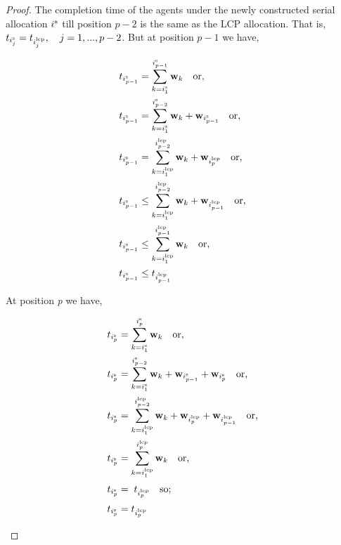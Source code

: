 \documentclass[letterpaper]{article} %
\theoremstyle{definition}
\begin{document}
\begin{proof}
\noindent The completion time of the agents under the newly constructed serial allocation $i^{\textnormal{s}}$ till position $p-2$ is the same as the LCP allocation. That is, $t_{i^{\textnormal{s}}_{j}} = t_{i^{\textnormal{lcp}}_{j}}, \quad j = 1, ..., p-2$. But at position $p-1$ we have,
\begin{linenomath}
\begin{equation*}
\begin{split}
t_{i^{\textnormal{s}}_{p-1}} & = \displaystyle \sum^{i^{\textnormal{s}}_{p-1}}_{k=i^{\textnormal{s}}_{1}} \mathbf{w}_{k} \quad  \textnormal{or,}\\
t_{i^{\textnormal{s}}_{p-1}} & = \displaystyle \sum^{i^{\textnormal{s}}_{p-2}}_{k=i^{\textnormal{s}}_{1}} \mathbf{w}_{k} + \mathbf{w}_{i^{\textnormal{s}}_{p-1}} \quad \textnormal{or,}\\
t_{i^{\textnormal{s}}_{p-1}} & = \displaystyle \sum^{i^{\textnormal{lcp}}_{p-2}}_{k=i^{\textnormal{lcp}}_{1}} \mathbf{w}_{k} + \mathbf{w}_{i^{\textnormal{lcp}}_{p}} \quad \textnormal{or,}\\
t_{i^{\textnormal{s}}_{p-1}} & \leq \displaystyle \sum^{i^{\textnormal{lcp}}_{p-2}}_{k=i^{\textnormal{lcp}}_{1}} \mathbf{w}_{k} + \mathbf{w}_{i^{\textnormal{lcp}}_{p-1}} \quad \textnormal{or,}\\
t_{i^{\textnormal{s}}_{p-1}} & \leq \displaystyle \sum^{i^{\textnormal{lcp}}_{p-1}}_{k=i^{\textnormal{lcp}}_{1}} \mathbf{w}_{k} \quad \textnormal{or,}\\
t_{i^{\textnormal{s}}_{p-1}} & \leq t_{i^{\textnormal{lcp}}_{p-1}}
\end{split}    
\end{equation*}
\end{linenomath}

\noindent At position \textit{p} we have,
\begin{linenomath}
\begin{equation*}
\begin{split}
t_{i^{\textnormal{s}}_{p}} & =\displaystyle \sum^{i^{\textnormal{s}}_{p}}_{k=i^{\textnormal{s}}_{1}} \mathbf{w}_{k} \quad \textnormal{or,}\\
t_{i^{\textnormal{s}}_{p}} & = \displaystyle \sum^{i^{\textnormal{s}}_{p-2}}_{k=i^{\textnormal{s}}_{1}} \mathbf{w}_{k} + \mathbf{w}_{i^{\textnormal{s}}_{p-1}} + \mathbf{w}_{i^{\textnormal{s}}_{p}} \quad \textnormal{or,}\\ t_{i^{\textnormal{s}}_{p}} & = \displaystyle \sum^{i^{\textnormal{lcp}}_{p-2}}_{k=i^{\textnormal{lcp}}_{1}} \mathbf{w}_{k} + \mathbf{w}_{i^{\textnormal{lcp}}_{p}} + \mathbf{w}_{i^{\textnormal{lcp}}_{p-1}} \quad \textnormal{or,}\\
t_{i^{\textnormal{s}}_{p}} & = \displaystyle \sum^{i^{\textnormal{lcp}}_{p}}_{k=i^{\textnormal{lcp}}_{1}} \mathbf{w}_{k} \quad \textnormal{or,}\\[2 pt]
t_{i^{\textnormal{s}}_{p}}  & = \; t_{i^{\textnormal{lcp}}_{p}}\quad \textnormal{so;}\\[2 pt]
t_{i^{\textnormal{s}}_{p}} & = t_{i^{\textnormal{lcp}}_{p}}\\
\end{split}    
\end{equation*}
\end{linenomath}


\end{proof}
\end{document}
